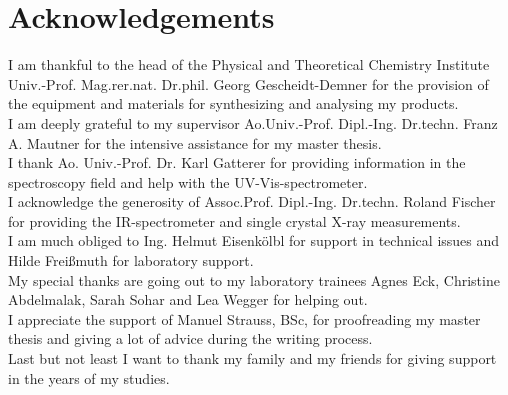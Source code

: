 \chapter*{Acknowledgements}

I am thankful to the head of the Physical and Theoretical Chemistry Institute Univ.-Prof. Mag.rer.nat. Dr.phil. Georg Gescheidt-Demner for the provision of the equipment and materials for synthesizing and analysing my products. \\

I am deeply grateful to my supervisor Ao.Univ.-Prof. Dipl.-Ing. Dr.techn. Franz A. Mautner for the intensive assistance for my master thesis. \\

I thank Ao. Univ.-Prof. Dr. Karl Gatterer for providing information in the spectroscopy field and help with the UV-Vis-spectrometer. \\

I acknowledge the generosity of Assoc.Prof. Dipl.-Ing. Dr.techn. Roland Fischer for providing  the IR-spectrometer and single crystal X-ray measurements. \\

I am much obliged to Ing. Helmut Eisenkölbl for support in technical issues and Hilde Freißmuth for laboratory support. \\

My special thanks are going out to my laboratory trainees  Agnes Eck, Christine Abdelmalak, Sarah Sohar and Lea Wegger for helping out. \\

I appreciate the support of  Manuel Strauss, BSc, for proofreading my master thesis and giving a lot of advice during the writing process.\\

 Last but not least I want to thank my family and my friends for giving support in the years of my studies.